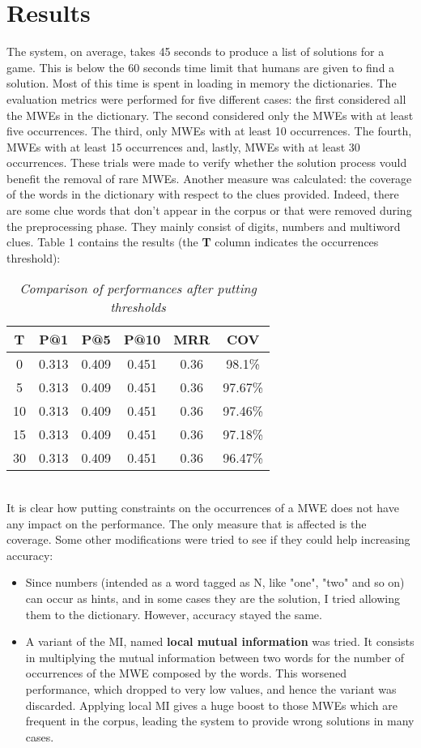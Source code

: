 \documentclass[twoside,twocolumn]{article}
\begin{document}
\section{Results}
	The system, on average, takes 45 seconds to produce a list of solutions for a game. This is below the 60 seconds time limit that humans are given to find a solution. Most of this time is spent in loading in memory the dictionaries. The evaluation metrics were performed for five different cases: the first considered all the MWEs in the dictionary. The second considered only the MWEs with at least five occurrences. The third, only MWEs with at least 10 occurrences. The fourth, MWEs with at least 15 occurrences and, lastly, MWEs with at least 30 occurrences. These trials were made to verify whether the solution process vould benefit the removal of rare MWEs. Another measure was calculated: the coverage of the words in the dictionary with respect to the clues provided. Indeed, there are some clue words that don't appear in the corpus or that were removed during the preprocessing phase. They mainly consist of digits, numbers and multiword clues. Table 1 contains the results (the \textbf{T} column indicates the occurrences threshold): \\
	\begin{table}[h!]
	\centering
	\begin{tabular}{| c c c c c c |}
	\hline
	T & P@1 & P@5 & P@10 & MRR & COV \\ [0.5ex]
	\hline \hline
	0 & 0.313 & 0.409 & 0.451 & 0.36 & 98.1\% \\
	5 & 0.313 & 0.409 & 0.451 & 0.36 & 97.67\% \\
	10 & 0.313 & 0.409 & 0.451 & 0.36 & 97.46\% \\
	15 & 0.313 & 0.409 & 0.451 & 0.36 & 97.18\% \\
	30 & 0.313 & 0.409 & 0.451 & 0.36 & 96.47\% \\
	\hline
	\end{tabular}
	\caption{\textit{Comparison of performances after putting thresholds}}
	\end{table} \\
	It is clear how putting constraints on the occurrences of a MWE does not have any impact on the performance. The only measure that is affected is the coverage. Some other modifications were tried to see if they could help increasing accuracy:
	\begin{itemize}
	\item Since numbers (intended as a word tagged as N, like "one", "two" and so on) can occur as hints, and in some cases they are the solution, I tried allowing them to the dictionary. However, accuracy stayed the same.
	\item A variant of the MI, named \textbf{local mutual information} was tried. It consists in multiplying the mutual information between two words for the number of occurrences of the MWE composed by the words. This worsened performance, which dropped to very low values, and hence the variant was discarded. Applying local MI gives a huge boost to those MWEs which are frequent in the corpus, leading the system to provide wrong solutions in many cases.
	\end{itemize}
\end{document}
